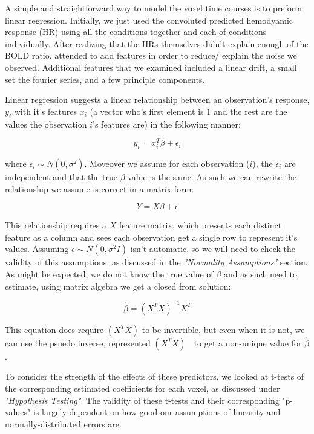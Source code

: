 
\par \indent A simple and straightforward way to model the voxel time courses
is to preform linear regression. Initially, we just used the convoluted predicted
hemodyamic response (HR) using all the conditions together and each of 
conditions individually. After realizing that the HRs themselves didn't explain
enough of the BOLD ratio, attended to add features in order to reduce/ explain
the noise we observed. Additional features that we examined included a 
linear drift, a small set the fourier series, and a few principle components.

Linear regression suggests a linear relationship between an observation's response,
$y_i$ with it's features $x_i$ (a vector who's first element is $1$ and the rest are
the values the observation $i$'s features are) in the following manner:

\begin{equation}
y_i = x_i^T \beta + \epsilon_i
\end{equation}

where $\epsilon_i \sim N(0, \sigma^2)$. Moveover we assume for each observation
($i$), the $\epsilon_i$ are independent and that the true $\beta$ value is the same.
As such we can rewrite the relationship we assume is correct in a matrix form:

\begin{equation}
Y = X\beta + \epsilon
\end{equation}

This relationship requires a $X$ feature matrix, which presents each distinct feature
as a column and sees each observation get a single row to represent it's values.
Assuming $\epsilon \sim N(0,\sigma^2 I)$ isn't automatic, so we will need to check 
the validity of this assumptions, as discussed in the \textit{"Normality Assumptions"} 
section. As might be expected, we do not know the true value of $\beta$ and as such
need to estimate, using matrix algebra we get a closed from solution:

\begin{equation}
\hat{\beta} =(X^T X)^{-1} X^T 
\end{equation}

This equation does require $(X^T X)$ to be invertible, but even when it is not, we
can use the psuedo inverse, represented  $(X^T X)^{-}$ to get a non-unique value
for $\hat{\beta}$.
\par To consider the strength of the effects of these predictors, we looked 
at t-tests of the corresponding estimated coefficients for each voxel, as 
discussed under \textit{"Hypothesis Testing"}. The validity of these t-tests and 
their corresponding "p-values" is largely dependent on how good our assumptions 
of linearity and normally-distributed errors are. 

